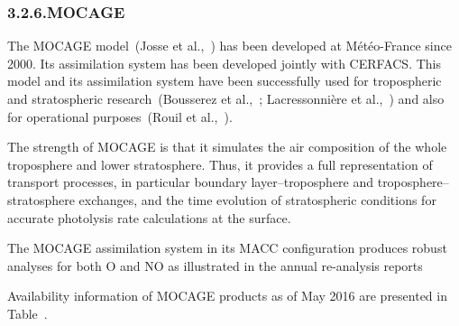 \documentclass[9pt]{report}
\begin{document}
\subsubsection{3.2.6.\hspace*{0.5em}MOCAGE}\label{sec-mocage}%

\noindent{}The MOCAGE model~(Josse et al.,~) has been developed at Météo-France since 2000. 
Its assimilation system has been developed jointly with CERFACS. 
This model and its assimilation system have been successfully used for tropospheric and stratospheric research~(Bousserez et al.,~; Lacressonni\`{e}re et al.,~) and also for operational purposes~(Rouil et al.,~).%

The strength of MOCAGE is that it simulates the air composition of the whole troposphere and lower stratosphere. 
Thus, it provides a full representation of transport processes, in particular boundary layer–troposphere and troposphere–stratosphere exchanges, and the time evolution of stratospheric conditions for accurate photolysis rate calculations at the surface.%

The MOCAGE assimilation system in its MACC conﬁguration produces robust analyses for both O and NO as illustrated in the annual re-analysis reports %

Availability information of MOCAGE products as of May 2016 are presented in Table~.%
\end{document}
